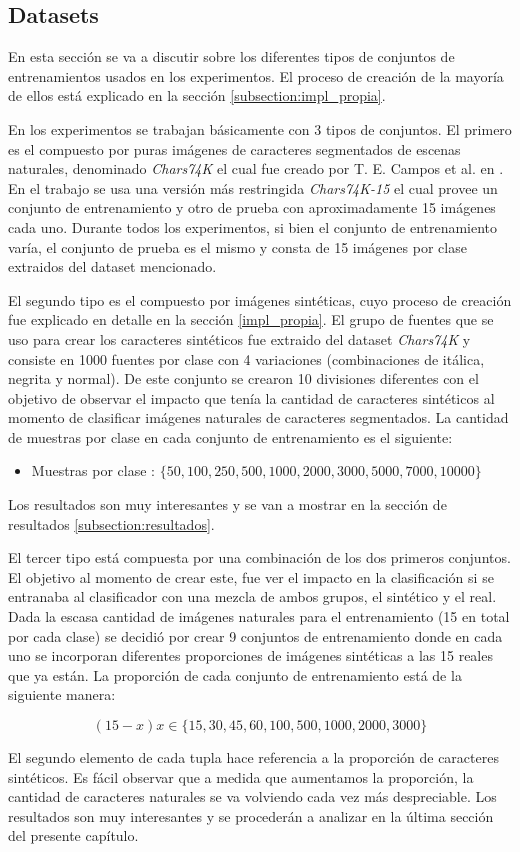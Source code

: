 \subsection{Datasets}

	En esta sección se va a discutir sobre los diferentes tipos de conjuntos de entrenamientos usados en los experimentos. El proceso de creación de la mayoría de ellos está explicado en la sección \ref{subsection:impl_propia}.
	
	En los experimentos se trabajan básicamente con 3 tipos de conjuntos. El primero es el compuesto por puras imágenes de caracteres segmentados de escenas naturales, denominado \textit{Chars74K} el cual fue creado por T. E. Campos et al. en \cite{dCBV09}. En el trabajo se usa una versión más restringida \textit{Chars74K-15} el cual provee un conjunto de entrenamiento y otro de prueba con aproximadamente 15 imágenes cada uno. Durante todos los experimentos, si bien el conjunto de entrenamiento varía, el conjunto de prueba es el mismo y consta de 15 imágenes por clase extraidos del dataset mencionado.
	
	El segundo tipo es el compuesto por imágenes sintéticas, cuyo proceso de creación fue explicado en detalle en la sección \ref{impl_propia}. El grupo de fuentes que se uso para crear los caracteres sintéticos fue extraido del dataset \textit{Chars74K} y consiste en 1000 fuentes por clase con 4 variaciones (combinaciones de itálica, negrita y normal). De este conjunto se crearon 10 divisiones diferentes con el objetivo de observar el impacto que tenía la cantidad de caracteres sintéticos al momento de clasificar imágenes naturales de caracteres segmentados. La cantidad de muestras por clase en cada conjunto de entrenamiento es el siguiente:
	\begin{itemize}
		\item Muestras por clase : $\{ 50,100,250,500,1000,2000,3000,5000,7000,10000\}$
	\end{itemize}

	 Los resultados son muy interesantes y se van a mostrar en la sección de resultados \ref{subsection:resultados}.
	
	El tercer tipo está compuesta por una combinación de los dos primeros conjuntos. El objetivo al momento de crear este, fue ver el impacto en la clasificación si se entranaba al clasificador con una mezcla de ambos grupos, el sintético y el real. Dada la escasa cantidad de imágenes naturales para el entrenamiento (15 en total por cada clase) se decidió por crear 9 conjuntos de entrenamiento donde en cada uno se incorporan diferentes proporciones de imágenes sintéticas a las 15 reales que ya están. La proporción de cada conjunto de entrenamiento está de la siguiente manera: 
	
	$$(15-x) x \in \{ 15,30,45,60,100,500,1000,2000,3000 \}$$
	
	El segundo elemento de cada tupla hace referencia a la proporción de caracteres sintéticos. Es fácil observar que a medida que aumentamos la proporción, la cantidad de caracteres naturales se va volviendo cada vez más despreciable. Los resultados son muy interesantes y se procederán a analizar en la última sección del presente capítulo.
	
